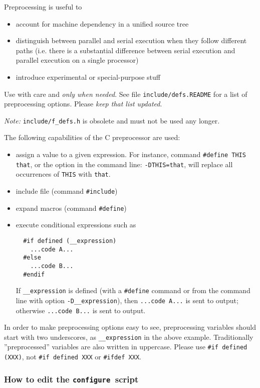 \documentclass[12pt,a4paper]{article}
\def\configure{\texttt{configure}}
\begin{document}
Preprocessing is useful to
\begin{itemize}
\item account for machine dependency in a unified source tree
\item distinguish between parallel and serial execution when they
follow different paths (i.e. there is a substantial difference between
serial execution and parallel execution on a single processor)
\item  introduce experimental or special-purpose stuff
\end{itemize}
Use with care and {\em only when needed}. See file
\texttt{include/defs.README} for a list of preprocessing
options. Please {\em keep that list updated}.

{\em Note:} \texttt{include/f\_defs.h} is obsolete and
must not be used any longer.

The following capabilities of the C preprocessor are used:
\begin{itemize}
\item assign a value to a given expression. For instance, command
  \texttt{\#define THIS that}, or the option in the command line:
  \texttt{-DTHIS=that}, will replace all occurrences of \texttt{THIS}
  with \texttt{that}.
\item include file (command \texttt{\#include})
\item expand macros (command \texttt{\#define})
\item execute conditional expressions such as
\begin{verbatim}
  #if defined (__expression)
    ...code A...
  #else
    ...code B...
  #endif
\end{verbatim}
If \texttt{\_\_expression} is defined (with a \texttt{\#define} command
or from the command line with option \texttt{-D\_\_expression}),
then  \texttt{...code A...} is sent to output; otherwise
\texttt{...code B...} is sent to output.

\end{itemize}
In order to make  preprocessing options
easy to see, preprocessing variables should start with
two underscores, as \texttt{\_\_expression} in the above
example. Traditionally ''preprocessed'' variables are also written in
uppercase. Please use \verb|#if defined (XXX)|, not
\verb|#if defined XXX| or \verb|#ifdef XXX|.

\subsubsection{How to edit the \configure\ script}
\end{document}
